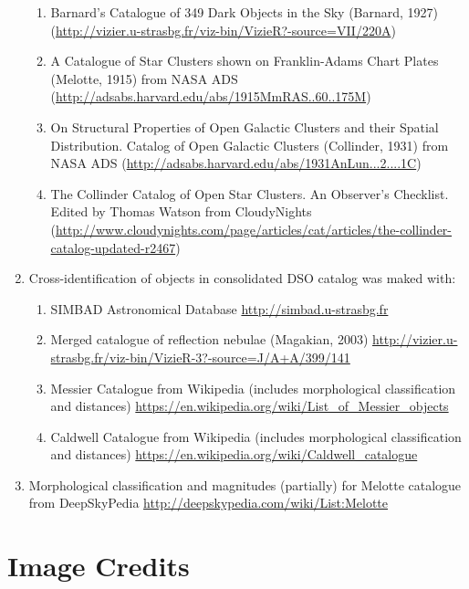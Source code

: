 \begin{enumerate}
\begin{enumerate}
     \item Barnard's Catalogue of 349 Dark Objects in the Sky    (Barnard, 1927)       (\url{http://vizier.u-strasbg.fr/viz-bin/VizieR?-source=VII/220A})
     \item A Catalogue of Star Clusters shown on Franklin-Adams Chart Plates (Melotte, 1915) from NASA ADS (\url{http://adsabs.harvard.edu/abs/1915MmRAS..60..175M})
     \item On Structural Properties of Open Galactic Clusters and their Spatial Distribution. Catalog of Open Galactic Clusters (Collinder, 1931)
	       from NASA ADS (\url{http://adsabs.harvard.edu/abs/1931AnLun...2....1C})
     \item The Collinder Catalog of Open Star Clusters. An Observer’s Checklist. Edited by Thomas Watson 
	       from CloudyNights (\url{http://www.cloudynights.com/page/articles/cat/articles/the-collinder-catalog-updated-r2467})
	\end{enumerate}
\item Cross-identification of objects in consolidated DSO catalog was maked with:
	\begin{enumerate}
    \item  SIMBAD Astronomical Database \url{http://simbad.u-strasbg.fr}
    \item  Merged catalogue of reflection nebulae (Magakian, 2003) \url{http://vizier.u-strasbg.fr/viz-bin/VizieR-3?-source=J/A+A/399/141}
    \item  Messier  Catalogue from Wikipedia (includes morphological classification and distances) \url{https://en.wikipedia.org/wiki/List_of_Messier_objects}
    \item  Caldwell Catalogue from Wikipedia (includes morphological classification and distances) \url{https://en.wikipedia.org/wiki/Caldwell_catalogue}
	\end{enumerate}
\item Morphological classification and magnitudes (partially) for Melotte catalogue from DeepSkyPedia \url{http://deepskypedia.com/wiki/List:Melotte}

\end{enumerate}


\section{Image Credits}
\label{sec:ack:images}

